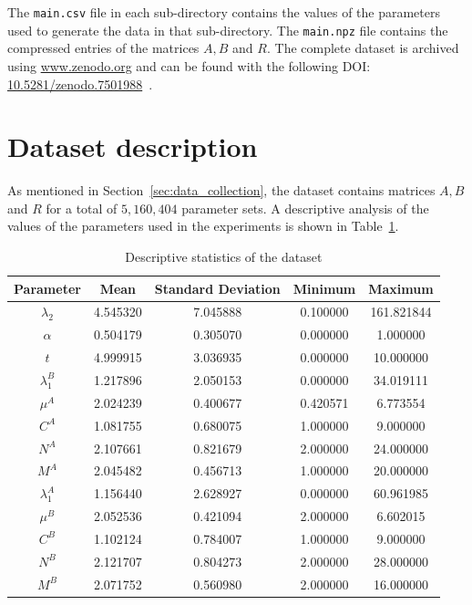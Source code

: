 The \lstinline{main.csv} file in each sub-directory contains the values of the
parameters used to generate the data in that sub-directory.
The \lstinline{main.npz} file contains the compressed entries of the matrices
\(A, B\) and \(R\).
The complete dataset is archived using \url{www.zenodo.org} and can be found
with the following DOI:
\url{10.5281/zenodo.7501988}~\cite{michalis_panayides_2023_7501988}.


\section{Dataset description}\label{sec:dataset_description}

As mentioned in Section~\ref{sec:data_collection}, the dataset contains
matrices \(A, B\) and \(R\) for a total of \(5,160,404\) parameter sets.
A descriptive analysis of the values of the parameters used in the experiments
is shown in Table~\ref{tab:parameters_descriptive}.


\begin{table}[H]
    \centering
    \caption{Descriptive statistics of the dataset}
    \begin{tabular}{|c|cccc|}
        \hline
        Parameter & Mean & Standard Deviation & Minimum & Maximum \\
        \hline
        \(\lambda_2\) & 4.545320 & 7.045888 & 0.100000 & 161.821844 \\
        \(\alpha\) & 0.504179 & 0.305070 & 0.000000 & 1.000000 \\
        \(t\) & 4.999915 & 3.036935 & 0.000000 & 10.000000 \\
        \hline
        \(\lambda_1^B\) & 1.217896 & 2.050153 & 0.000000 & 34.019111 \\
        \(\mu^A\) & 2.024239 & 0.400677 & 0.420571 & 6.773554 \\
        \(C^A\) & 1.081755 & 0.680075 & 1.000000 & 9.000000 \\
        \(N^A\) & 2.107661 & 0.821679 & 2.000000 & 24.000000 \\
        \(M^A\) & 2.045482 & 0.456713 & 1.000000 & 20.000000 \\
        \hline
        \(\lambda_1^A\) & 1.156440 & 2.628927 & 0.000000 & 60.961985 \\
        \(\mu^B\) & 2.052536 & 0.421094 & 2.000000 & 6.602015 \\
        \(C^B\) & 1.102124 & 0.784007 & 1.000000 & 9.000000 \\
        \(N^B\) & 2.121707 & 0.804273 & 2.000000 & 28.000000 \\
        \(M^B\) & 2.071752 & 0.560980 & 2.000000 & 16.000000 \\
        \hline
    \end{tabular}
    \label{tab:parameters_descriptive}
\end{table}


